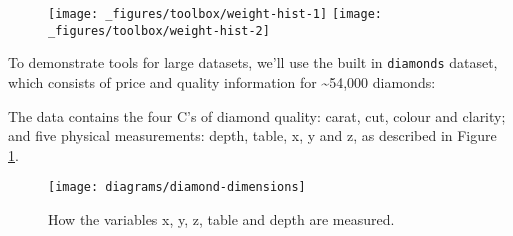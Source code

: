\begin{figure}[H]
  \texttt{[image: \_figures/toolbox/weight-hist-1]}%
  \texttt{[image: \_figures/toolbox/weight-hist-2]}
\end{figure}


To demonstrate tools for large datasets, we'll use the built in
\texttt{diamonds} dataset, which consists of price and quality
information for \textasciitilde{}54,000 diamonds:

\begin{Shaded}
\begin{Highlighting}[]
\CommentTok{#> }
\end{Highlighting}
\end{Shaded}

The data contains the four C's of diamond quality: carat, cut, colour
and clarity; and five physical measurements: depth, table, x, y and z,
as described in Figure \ref{fig:diamond-dim}.

\begin{figure}[htbp]
  \centering
    \texttt{[image: diagrams/diamond-dimensions]}
  \caption{How the variables x, y, z, table and depth are measured.}
  \label{fig:diamond-dim}
\end{figure}

